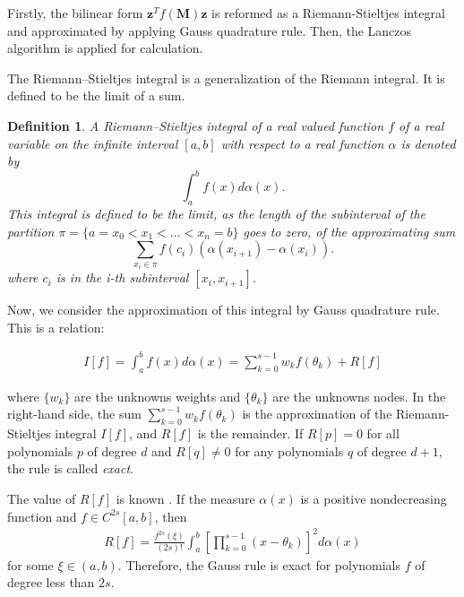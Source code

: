 \documentclass[senior,final,11pt]{iscs-thesis}
\newtheorem{definition}{Definition}
\begin{document}
Firstly, the bilinear form $\mathbf{z}^{T}f(\mathbf{M})\mathbf{z}$ is reformed as a Riemann-Stieltjes integral and approximated by applying Gauss quadrature rule. Then, the Lanczos algorithm is applied for calculation.

The Riemann–Stieltjes integral is a generalization of the Riemann integral. It is defined to be the limit of a sum.
\begin{definition}
    A Riemann–Stieltjes integral of a real valued function $f$ of a real variable on the infinite interval $[a,b]$ with respect to a real function $\alpha$ is denoted by
    \[ \int_a^b f(x) d\alpha (x). \]
    This integral is defined to be the limit, as the length of the subinterval of the partition $\pi=\{a=x_0 < x_1 < ... < x_n = b\}$ goes to zero, of the approximating sum
    \[ \sum_{x_i \in \pi} f(c_i)(\alpha(x_{i+1}) - \alpha(x_i)).\]
    where $c_i$ is in the i-th subinterval $[x_i, x_{i+1}]$.
\end{definition}

Now, we consider the approximation of this integral by Gauss quadrature rule. This is a relation:

\begin{align}
    I[f] =\int_a^b f(x) d\alpha(x) = \sum_{k=0}^{s-1} w_k f(\theta_k) + R[f]
\end{align}

where $\{w_k\}$ are the unknowns weights and $\{\theta_k\}$ are the unknowns nodes. In the right-hand side, the sum $\sum_{k=0}^{s-1} w_k f(\theta_k)$ is the approximation of the Riemann-Stieltjes integral $I[f]$, and $R[f]$ is the remainder. If $R[p]=0$ for all polynomials $p$ of degree $d$ and $R[q] \neq 0$ for any polynomials $q$ of degree $d+1$, the rule is called {\it exact}.

The value of $R[f]$ is known \cite{golub2009matrices,stoer2013introduction}. If the measure $\alpha(x)$ is a positive nondecreasing function and $f \in C^{2s}[a,b]$, then
\begin{align}
    R[f] = \frac{f^{2s}(\xi)}{(2s)!} \int_a^b \left[\prod_{k=0}^{s-1}(x-\theta_k) \right]^2 d\alpha(x)
\end{align}
for some $\xi \in (a,b)$. Therefore, the Gauss rule is exact for polynomials $f$ of degree less than $2s$.
\end{document}
